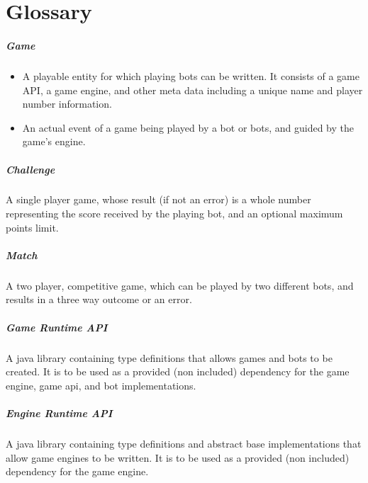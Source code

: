 
%

	\chapter*{Glossary}

	\paragraph{Game}
	\begin{itemize}
		\item A playable entity for which playing bots can be written. It consists of a game API, a game engine, and other meta data including a unique name and player number information. 
		
		\item An actual event of a game being played by a bot or bots, and guided by the game's engine.
	\end{itemize}
	
	\paragraph{Challenge} A single player game, whose result (if not an error) is a whole number representing the score received by the playing bot, and an optional maximum points limit.
  
  	\paragraph{Match} A two player, competitive game, which can be played by two different bots, and results in a three way outcome or an error.
  
  	\paragraph{Game Runtime API} A java library containing type definitions that allows games and bots to be created. It is to be used as a provided (non included) dependency for the game engine, game api, and bot implementations.
  	
  	\paragraph{Engine Runtime API} A java library containing type definitions and abstract base implementations that allow game engines to be written. It is to be used as a provided (non included) dependency for the game engine.
  
